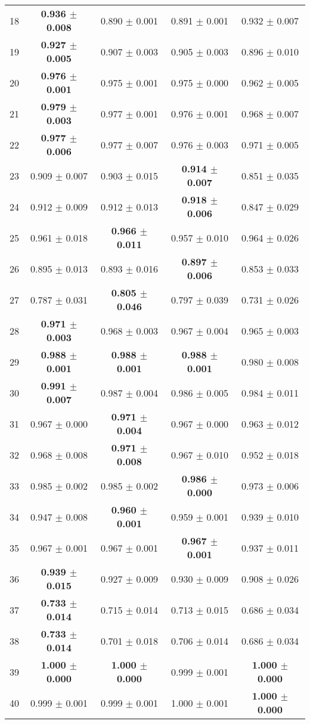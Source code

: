 \begin{table}[!ht]
{\begin{tabular}{r c c c c}
18 & \textbf{0.936 $\pm$ 0.008} & 0.890 $\pm$ 0.001 & 0.891 $\pm$ 0.001 & 0.932 $\pm$ 0.007 \\
19 & \textbf{0.927 $\pm$ 0.005} & 0.907 $\pm$ 0.003 & 0.905 $\pm$ 0.003 & 0.896 $\pm$ 0.010 \\
20 & \textbf{0.976 $\pm$ 0.001} & 0.975 $\pm$ 0.001 & 0.975 $\pm$ 0.000 & 0.962 $\pm$ 0.005 \\
21 & \textbf{0.979 $\pm$ 0.003} & 0.977 $\pm$ 0.001 & 0.976 $\pm$ 0.001 & 0.968 $\pm$ 0.007 \\
22 & \textbf{0.977 $\pm$ 0.006} & 0.977 $\pm$ 0.007 & 0.976 $\pm$ 0.003 & 0.971 $\pm$ 0.005 \\
23 & 0.909 $\pm$ 0.007 & 0.903 $\pm$ 0.015 & \textbf{0.914 $\pm$ 0.007} & 0.851 $\pm$ 0.035 \\
24 & 0.912 $\pm$ 0.009 & 0.912 $\pm$ 0.013 & \textbf{0.918 $\pm$ 0.006} & 0.847 $\pm$ 0.029 \\
25 & 0.961 $\pm$ 0.018 & \textbf{0.966 $\pm$ 0.011} & 0.957 $\pm$ 0.010 & 0.964 $\pm$ 0.026 \\
26 & 0.895 $\pm$ 0.013 & 0.893 $\pm$ 0.016 & \textbf{0.897 $\pm$ 0.006} & 0.853 $\pm$ 0.033 \\
27 & 0.787 $\pm$ 0.031 & \textbf{0.805 $\pm$ 0.046} & 0.797 $\pm$ 0.039 & 0.731 $\pm$ 0.026 \\
28 & \textbf{0.971 $\pm$ 0.003} & 0.968 $\pm$ 0.003 & 0.967 $\pm$ 0.004 & 0.965 $\pm$ 0.003 \\
29 & \textbf{0.988 $\pm$ 0.001} & \textbf{0.988 $\pm$ 0.001} & \textbf{0.988 $\pm$ 0.001} & 0.980 $\pm$ 0.008 \\
30 & \textbf{0.991 $\pm$ 0.007} & 0.987 $\pm$ 0.004 & 0.986 $\pm$ 0.005 & 0.984 $\pm$ 0.011 \\
31 & 0.967 $\pm$ 0.000 & \textbf{0.971 $\pm$ 0.004} & 0.967 $\pm$ 0.000 & 0.963 $\pm$ 0.012 \\
32 & 0.968 $\pm$ 0.008 & \textbf{0.971 $\pm$ 0.008} & 0.967 $\pm$ 0.010 & 0.952 $\pm$ 0.018 \\
33 & 0.985 $\pm$ 0.002 & 0.985 $\pm$ 0.002 & \textbf{0.986 $\pm$ 0.000} & 0.973 $\pm$ 0.006 \\
34 & 0.947 $\pm$ 0.008 & \textbf{0.960 $\pm$ 0.001} & 0.959 $\pm$ 0.001 & 0.939 $\pm$ 0.010 \\
35 & 0.967 $\pm$ 0.001 & 0.967 $\pm$ 0.001 & \textbf{0.967 $\pm$ 0.001} & 0.937 $\pm$ 0.011 \\
36 & \textbf{0.939 $\pm$ 0.015} & 0.927 $\pm$ 0.009 & 0.930 $\pm$ 0.009 & 0.908 $\pm$ 0.026 \\
37 & \textbf{0.733 $\pm$ 0.014} & 0.715 $\pm$ 0.014 & 0.713 $\pm$ 0.015 & 0.686 $\pm$ 0.034 \\
38 & \textbf{0.733 $\pm$ 0.014} & 0.701 $\pm$ 0.018 & 0.706 $\pm$ 0.014 & 0.686 $\pm$ 0.034 \\
39 & \textbf{1.000 $\pm$ 0.000} & \textbf{1.000 $\pm$ 0.000} & 0.999 $\pm$ 0.001 & \textbf{1.000 $\pm$ 0.000} \\
40 & 0.999 $\pm$ 0.001 & 0.999 $\pm$ 0.001 & 1.000 $\pm$ 0.001 & \textbf{1.000 $\pm$ 0.000} \\
\end{tabular}}
\end{table}
